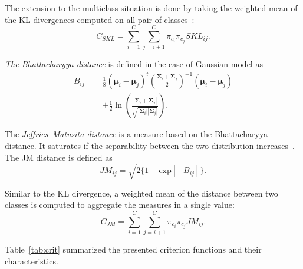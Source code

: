 \documentclass[journal,peerreview,onecolumn]{IEEEtran}
\begin{document}
        The extension  to the multiclass  situation is done  by taking
        the weighted mean  of the KL divergences computed  on all pair
        of classes~\cite{bruzzone1995extension}:
        \begin{equation}
            C_{SKL} = \sum_{i=1}^{C} \sum_{j=i + 1}^{C} \pi_{c_i} \pi_{c_j} SKL_{ij}.
        \end{equation}

        \emph{The Bhattacharyya distance} is defined in the case of Gaussian model as
        \begin{align}
            {B}_{ij} = &\frac{1}{8} (\boldsymbol{\mu}_i - \boldsymbol{\mu}_j)^t \left( \frac{\boldsymbol{\Sigma}_i + \boldsymbol{\Sigma}_j}{2} \right)^{-1} (\boldsymbol{\mu}_i - \boldsymbol{\mu}_j) \nonumber \\
            &+ \frac{1}{2} \ln \left( \frac{|\boldsymbol{\Sigma}_i + \boldsymbol{\Sigma}_j|}{\sqrt{|\boldsymbol{\Sigma}_i| |\boldsymbol{\Sigma}_j|}} \right).
        \end{align}

        The \emph{Jeffries–Matusita distance} is a measure based on the Bhattacharyya distance. It saturates if the separability between the two distribution increases~\cite{bruzzone2009novel}. The JM distance is defined as
        \begin{equation}
            {JM}_{ij} = \sqrt{ 2 \{1 - \text{exp}[-B_{ij}]\} }.
        \end{equation}

        Similar to the KL divergence,  a weighted mean of the distance
        between two classes is computed to aggregate the measures in a
        single value:
        \begin{equation}
            {C}_{JM} = \sum_{i=1}^{C} \sum_{j=i + 1}^{C} \pi_{c_i} \pi_{c_j} {JM}_{ij}.
        \end{equation}

        \vspace{10 mm}


        Table~\ref{tab:crit} summarized the presented criterion functions and their characteristics.
\end{document}
